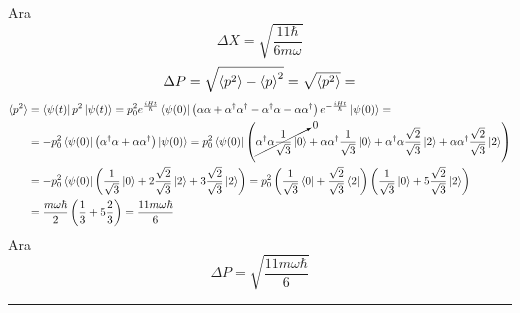 \documentclass[12pt]{article}
\begin{document}
Ara $$\Delta X = \sqrt{\frac{11\hbar}{6m\omega}}$$
\begin{align*}
    \Delta P = \sqrt{\braket{p^2}- \braket{p}^2} = \sqrt{\braket{p^2}} = 
\end{align*}
\begin{align*}
    \braket{p^2} &= \bra{\psi(t)}p^2\ket{\psi(t)} = p_0^2 e^{\frac{iHt}{\hbar}}\bra{\psi(0)}\left(\alpha \alpha +\alpha^\dag\alpha^\dag - \alpha^\dag \alpha -\alpha \alpha^\dag\right)e^{-\frac{iHt}{\hbar}}\ket{\psi(0)} = \\
    &=-p_0^2 \bra{\psi(0)}\left( \alpha^\dag \alpha +\alpha \alpha^\dag\right)\ket{\psi(0)} = p_0^2\bra{\psi(0)}\left(\cancelto{0}{\alpha^\dag \alpha\frac{1}{\sqrt{3}}\ket{0}}+\alpha \alpha^\dag\frac{1}{\sqrt{3}}\ket{0} +\alpha^\dag \alpha\frac{\sqrt{2}}{\sqrt{3}}\ket{2}+\alpha \alpha^\dag\frac{\sqrt{2}}{\sqrt{3}}\ket{2} \right)\\
    &=-p_0^2\bra{\psi(0)}\left(\frac{1}{\sqrt{3}}\ket{0} +2\frac{\sqrt{2}}{\sqrt{3}}\ket{2}+3\frac{\sqrt{2}}{\sqrt{3}}\ket{2} \right) = p_0^2\left(\frac{1}{\sqrt{3}}\bra{0} +\frac{\sqrt{2}}{\sqrt{3}}\bra{2} \right)\left(\frac{1}{\sqrt{3}}\ket{0} +5\frac{\sqrt{2}}{\sqrt{3}}\ket{2} \right)\\
    &=\frac{m\omega\hbar}{2}\left(\frac{1}{3}+ 5\frac{2}{3}\right) = \frac{11m\omega\hbar}{6}
\end{align*}
Ara $$\Delta P = \sqrt{\frac{11m\omega\hbar}{6}}$$
\rule{\textwidth}{.5pt}
\end{document}
